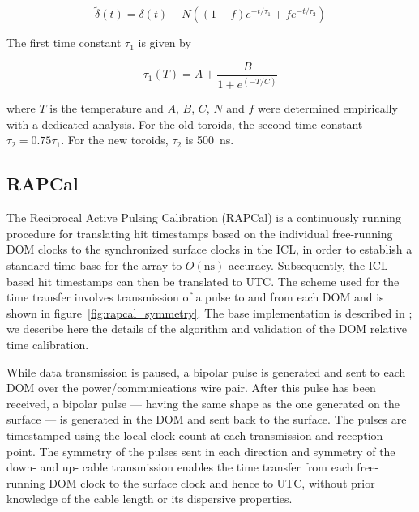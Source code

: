 \begin{equation}
\tilde{\delta}(t) = \delta (t) - N((1 - f) e^{-t/\tau_1} +f
e^{-t/\tau_2})
\end{equation}

\noindent The first time constant $\tau_1$ is given by 

\begin{equation}
\tau_1(T) = A + \frac{B}{1 + e^{(-T/C)}}
\end{equation}

\noindent where $T$ is the temperature and $A$, $B$, $C$, $N$ and $f$ were
determined empirically with a dedicated analysis. For the old toroids, the
second time constant $\tau_2 =0.75\tau_1$. For the new toroids, $\tau_2$ is 500~ns.

\subsection{\label{sect:dom:rapcal}RAPCal}

The Reciprocal Active Pulsing Calibration (RAPCal) is a
continuously running procedure for translating hit timestamps based on the 
individual free-running DOM clocks to the synchronized surface clocks in the
ICL, in order to establish a standard time base for the array to
$O(\mathrm{ns})$ accuracy.  Subsequently, the ICL-based hit timestamps can
then be translated to UTC.  The scheme used for the time transfer involves
transmission of a pulse to and from each DOM and is shown in
figure~\ref{fig:rapcal_symmetry}.  The base implementation is described in
\cite{ICECUBE:DAQ}; we describe here the details of the 
algorithm and validation of the DOM relative time calibration. 

While data transmission is paused, a bipolar pulse is generated and sent to
each DOM over the power/communications wire pair.  After 
this pulse has been received, a bipolar pulse --- having the same shape
as the one generated on the surface --- is generated in the DOM and sent
back to the surface.  The pulses are timestamped using the local
clock count at each transmission and reception point.  The symmetry of the
pulses sent in each direction and symmetry of the down- and up- cable
transmission enables the time transfer from each free-running DOM clock to the
surface clock and hence to UTC, without prior knowledge of the cable length
or its dispersive properties.

